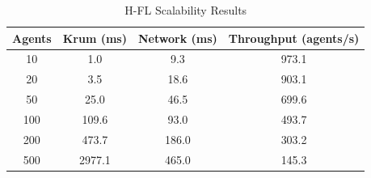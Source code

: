 \begin{table}[h]
\centering
\caption{H-FL Scalability Results}
\begin{tabular}{|c|c|c|c|}
\hline
Agents & Krum (ms) & Network (ms) & Throughput (agents/s) \\
\hline
10 & 1.0 & 9.3 & 973.1 \\
20 & 3.5 & 18.6 & 903.1 \\
50 & 25.0 & 46.5 & 699.6 \\
100 & 109.6 & 93.0 & 493.7 \\
200 & 473.7 & 186.0 & 303.2 \\
500 & 2977.1 & 465.0 & 145.3 \\
\hline
\end{tabular}
\end{table}
